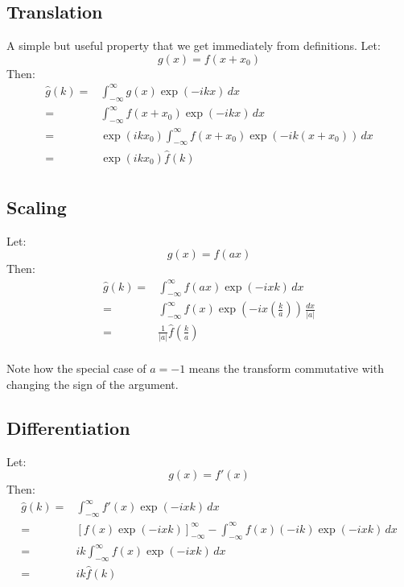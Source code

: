 \documentclass[12pt]{report}
\begin{document}
\subsection{Translation}
A simple but useful property that we get immediately from definitions.
Let:
\[g(x) = f(x+x_0)\]
Then:
\begin{equation*}
\begin{aligned}
\hat{g}(k) =& \int_{-\infty}^{\infty}g(x)\exp(-ikx)\,dx\\
=& \int_{-\infty}^{\infty}f(x+x_0)\exp(-ikx)\,dx\\
=&\exp(ikx_0) \int_{-\infty}^{\infty}f(x+x_0)\exp(-ik(x+x_0))\,dx\\
=&\exp(ikx_0) \hat{f}(k)\\
\end{aligned}
\end{equation*}

\subsection{Scaling}
Let:
\[g(x) = f(ax) \]
Then:
\begin{equation*}
\begin{aligned}
	\hat{g}(k) =& \int_{-\infty}^{\infty}f(ax)\exp(-ixk)\,dx\\
	=& \int_{-\infty}^{\infty}f(x)\exp\left(-ix\left(\frac{k}{a}\right)\right)\,\frac{dx}{|a|}\\
	=& \frac{1}{|a|}\hat{f}\left(\frac{k}{a}\right) \\
\end{aligned}
\end{equation*}

Note how the special case of $a=-1$ means the transform commutative with changing the sign of the argument.

\subsection{Differentiation} 
Let:
\[g(x) = f'(x)\]
Then:
\begin{equation*}
\begin{aligned}
	\hat{g}(k) =& \int_{-\infty}^{\infty}f'(x)\exp(-ixk)\,dx\\
	=& \left[f(x)\exp(-ixk)\right]_{-\infty}^{\infty}-\int_{-\infty}^{\infty}f(x)(-ik)\exp(-ixk)\,dx\\
	=&ik\int_{-\infty}^{\infty}f(x)\exp(-ixk)\,dx\\
	=& ik\hat{f}(k) \\
\end{aligned}
\end{equation*}
\end{document}
